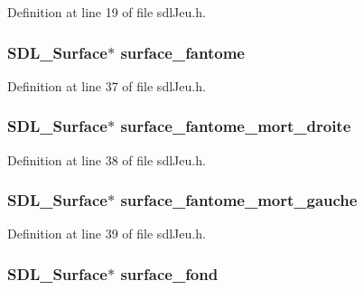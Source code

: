 Definition at line 19 of file sdl\-Jeu.\-h.

\hypertarget{structsdl_jeu_afff984367bbdf019fda00ae1d3e8a8d6}{
\subsubsection[{surface\-\_\-fantome}]{\setlength{\rightskip}{0pt plus 5cm}S\-D\-L\-\_\-\-Surface$\ast$ surface\-\_\-fantome}}\label{structsdl_jeu_afff984367bbdf019fda00ae1d3e8a8d6}


Definition at line 37 of file sdl\-Jeu.\-h.

\hypertarget{structsdl_jeu_a63e27a4ffca9b9d744f1c59ccceccfee}{
\subsubsection[{surface\-\_\-fantome\-\_\-mort\-\_\-droite}]{\setlength{\rightskip}{0pt plus 5cm}S\-D\-L\-\_\-\-Surface$\ast$ surface\-\_\-fantome\-\_\-mort\-\_\-droite}}\label{structsdl_jeu_a63e27a4ffca9b9d744f1c59ccceccfee}


Definition at line 38 of file sdl\-Jeu.\-h.

\hypertarget{structsdl_jeu_ad05a5d488af4b9304bd3a918bf03c699}{
\subsubsection[{surface\-\_\-fantome\-\_\-mort\-\_\-gauche}]{\setlength{\rightskip}{0pt plus 5cm}S\-D\-L\-\_\-\-Surface$\ast$ surface\-\_\-fantome\-\_\-mort\-\_\-gauche}}\label{structsdl_jeu_ad05a5d488af4b9304bd3a918bf03c699}


Definition at line 39 of file sdl\-Jeu.\-h.

\hypertarget{structsdl_jeu_af673014bd91e1e646926754799ab18d0}{
\subsubsection[{surface\-\_\-fond}]{\setlength{\rightskip}{0pt plus 5cm}S\-D\-L\-\_\-\-Surface$\ast$ surface\-\_\-fond}}\label{structsdl_jeu_af673014bd91e1e646926754799ab18d0}



